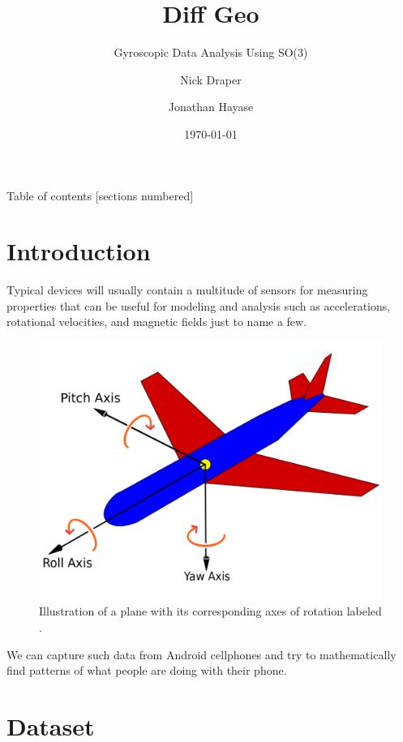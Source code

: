 \documentclass[10pt]{beamer}
\title{Diff Geo}
\subtitle{Gyroscopic Data Analysis Using SO(3)}
\date{\today}
\author{Nick Draper \and Jonathan Hayase}
\institute{Math 143 -- Differential Geometry Seminar -- Spring 2018}
\begin{document}
\maketitle

\begin{frame}{Table of contents}
    [sections numbered]
    \tableofcontents[hideallsubsections]
\end{frame}

\section{Introduction}

\begin{frame}
Typical devices will usually contain a multitude of sensors for measuring properties that can be useful for modeling and analysis such as accelerations, rotational velocities, and magnetic fields just to name a few. 
\begin{figure}
\includegraphics[scale=0.08]{images/plane.png}
\caption{Illustration of a plane with its corresponding axes of rotation labeled \cite{plane1}.}
\end{figure}
\end{frame}

\begin{frame}
We can capture such data from Android  cellphones and try to mathematically find patterns of what people are doing with their phone. 
\end{frame}

\section{Dataset}
\end{document}
